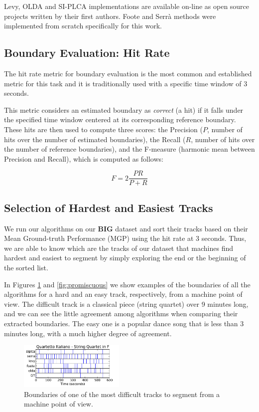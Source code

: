 \documentclass{article}
\begin{document}
Levy, OLDA and SI-PLCA implementations are available on-line as open source projects written by their first authors.
Foote and Serr\`a methods were implemented from scratch specifically for this work.

\subsection{Boundary Evaluation: Hit Rate}\label{subsec:hitrate}

The hit rate metric for boundary evaluation is the most common and established metric for this task and it is traditionally used with a specific time window of 3 seconds\cite{Ong2005}. 

This metric considers an estimated boundary as \emph{correct} (a hit) if it falls under the specified time window centered at its corresponding reference boundary.
These hits are then used to compute three scores: the Precision ($P$, number of hits over the number of estimated boundaries), the Recall ($R$, number of hits over the number of reference boundaries), and the F-measure (harmonic mean between Precision and Recall), which is computed as follows:

\begin{equation}
  F = 2 \frac{P R}{P + R}
\end{equation}

\subsection{Selection of Hardest and Easiest Tracks}\label{sub:hard-easy}

We run our algorithms on our \textbf{BIG} dataset and sort their tracks based on their Mean Ground-truth Performance (MGP) using the hit rate at 3 seconds.
Thus, we are able to know which are the tracks of our dataset that machines find hardest and easiest to segment by simply exploring the end or the beginning of the sorted list.

In Figures \ref{fig:quartetto} and \ref{fig:promiscuous} we show examples of the boundaries of all the algorithms for a hard and an easy track, respectively, from a machine point of view.
The difficult track is a classical piece (string quartet) over 9 minutes long, and we can see the little agreement among algorithms when comparing their extracted boundaries.
The easy one is a popular dance song that is less than 3 minutes long, with a much higher degree of agreement.

\begin{figure}
  \centering
  \includegraphics[width=0.45\textwidth, height=0.13\textheight]{plots/Quartetto-machine.pdf}
  \caption{Boundaries of one of the most difficult tracks to segment from a machine point of view.}
  \label{fig:quartetto}
\end{figure}%
\end{document}
